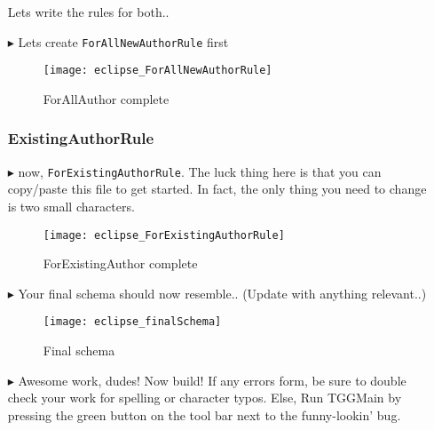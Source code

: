 \begin{itemize}
Lets write the rules for both..

\item[$\blacktriangleright$] Lets create \texttt{ForAllNewAuthorRule} first

\begin{figure}[htbp]
\begin{center}
  \texttt{[image: eclipse\_ForAllNewAuthorRule]}
  \caption{ForAllAuthor complete}
  \label{eclipse:ForAllNewAuthorRule}
\end{center}
\end{figure}

\subsubsection{ExistingAuthorRule} %
\item[$\blacktriangleright$] now, \texttt{ForExistingAuthorRule}. The luck thing here is that you can copy/paste this file to get started. In fact, the only
thing you need to change is two small characters.

\begin{figure}[htbp]
\begin{center}
  \texttt{[image: eclipse\_ForExistingAuthorRule]}
  \caption{ForExistingAuthor complete}
  \label{eclipse:ForExistingAuthorRule}
\end{center}
\end{figure}

\item[$\blacktriangleright$] Your final schema should now resemble.. (Update with anything relevant..)

\begin{figure}[htbp]
\begin{center}
  \texttt{[image: eclipse\_finalSchema]}
  \caption{Final schema}
  \label{eclipse:schemaFinal}
\end{center}
\end{figure}

\item[$\blacktriangleright$] Awesome work, dudes! Now build! If any errors form, be sure to double check your work for spelling or character typos. Else, Run
TGGMain by pressing the green button on the tool bar next to the funny-lookin' bug.


\end{itemize}
